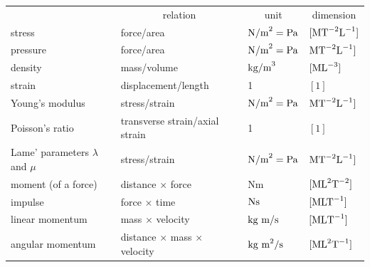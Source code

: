 \documentclass[graybox,envcountchap,sectrefs,final]{svmonodo}
\begin{document}
{\small   %

\vspace{4mm}

\begin{tabular}{llll}
\hline\noalign{\smallskip}
\multicolumn{1}{c}{ Quantity } & \multicolumn{1}{c}{ relation } & \multicolumn{1}{c}{ unit } & \multicolumn{1}{c}{ dimension } \\
\noalign{\smallskip}\svhline\noalign{\smallskip}
stress                               & force/area                               & $\hbox{N/m}^2 = \hbox{Pa}$     & $[\hbox{M}\hbox{T}^{-2}\hbox{L}^{-1}]$  \\
pressure                             & force/area                               & $\hbox{N/m}^2 = \hbox{Pa}$     & $\hbox{M}\hbox{T}^{-2}\hbox{L}^{-1}]$   \\
density                              & mass/volume                              & $\hbox{kg/m}^3$                & $[\hbox{ML}^{-3}]$                      \\
strain                               & displacement/length                      & 1                              & $[1]$                                   \\
Young's modulus                      & stress/strain                            & $\hbox{N/m}^2 = \hbox{Pa}$     & $\hbox{M}\hbox{T}^{-2}\hbox{L}^{-1}]$   \\
Poisson's ratio                      & transverse strain/axial strain           & 1                              & $[1]$                                   \\
Lame' parameters $\lambda$ and $\mu$ & stress/strain                            & $\hbox{N/m}^2 = \hbox{Pa}$     & $\hbox{M}\hbox{T}^{-2}\hbox{L}^{-1}]$   \\
moment (of a force)                  & distance $\times$ force                  & Nm                             & $[\hbox{ML}^2\hbox{T}^{-2}]$            \\
impulse                              & force $\times$ time                      & $\hbox{Ns}$                    & $[\hbox{MLT}^{-1}]$                     \\
linear momentum                      & mass $\times$ velocity                   & $\hbox{kg m/s}$                & $[\hbox{ML}\hbox{T}^{-1}]$              \\
angular momentum                     & distance $\times$ mass $\times$ velocity & $\hbox{kg m}^2/\hbox{s}$       & $[\hbox{ML}^2\hbox{T}^{-1}]$            \\

\end{tabular}}
\end{document}
